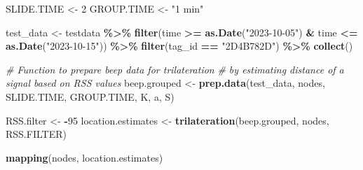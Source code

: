 \documentclass[
]{book}
\newenvironment{Shaded}{\begin{snugshade}}{\end{snugshade}}
\newcommand{\CommentTok}[1]{\textcolor[rgb]{0.56,0.35,0.01}{\textit{#1}}}
\newcommand{\DecValTok}[1]{\textcolor[rgb]{0.00,0.00,0.81}{#1}}
\newcommand{\FunctionTok}[1]{\textcolor[rgb]{0.13,0.29,0.53}{\textbf{#1}}}
\newcommand{\NormalTok}[1]{#1}
\newcommand{\OtherTok}[1]{\textcolor[rgb]{0.56,0.35,0.01}{#1}}
\newcommand{\SpecialCharTok}[1]{\textcolor[rgb]{0.81,0.36,0.00}{\textbf{#1}}}
\newcommand{\StringTok}[1]{\textcolor[rgb]{0.31,0.60,0.02}{#1}}
\begin{document}
\begin{Shaded}
\begin{Highlighting}[]
\NormalTok{SLIDE.TIME }\OtherTok{\textless{}{-}} \DecValTok{2}
\NormalTok{GROUP.TIME }\OtherTok{\textless{}{-}} \StringTok{"1 min"}

\NormalTok{test\_data }\OtherTok{\textless{}{-}}\NormalTok{ testdata }\SpecialCharTok{\%\textgreater{}\%}
  \FunctionTok{filter}\NormalTok{(time }\SpecialCharTok{\textgreater{}=} \FunctionTok{as.Date}\NormalTok{(}\StringTok{"2023{-}10{-}05"}\NormalTok{) }\SpecialCharTok{\&}\NormalTok{ time }\SpecialCharTok{\textless{}=} \FunctionTok{as.Date}\NormalTok{(}\StringTok{"2023{-}10{-}15"}\NormalTok{)) }\SpecialCharTok{\%\textgreater{}\%}
  \FunctionTok{filter}\NormalTok{(tag\_id }\SpecialCharTok{==} \StringTok{"2D4B782D"}\NormalTok{) }\SpecialCharTok{\%\textgreater{}\%}
  \FunctionTok{collect}\NormalTok{()}

\CommentTok{\# Function to prepare beep data for trilateration }
\CommentTok{\# by estimating distance of a signal based on RSS values}
\NormalTok{beep.grouped }\OtherTok{\textless{}{-}} \FunctionTok{prep.data}\NormalTok{(test\_data,}
\NormalTok{                          nodes,}
\NormalTok{                          SLIDE.TIME,}
\NormalTok{                          GROUP.TIME,}
\NormalTok{                          K, }
\NormalTok{                          a, }
\NormalTok{                          S) }

\NormalTok{RSS.filter }\OtherTok{\textless{}{-}} \SpecialCharTok{{-}}\DecValTok{95}
\NormalTok{location.estimates }\OtherTok{\textless{}{-}} \FunctionTok{trilateration}\NormalTok{(beep.grouped, nodes, RSS.FILTER)}

\FunctionTok{mapping}\NormalTok{(nodes, location.estimates)}
\end{Highlighting}
\end{Shaded}


  
\end{document}
